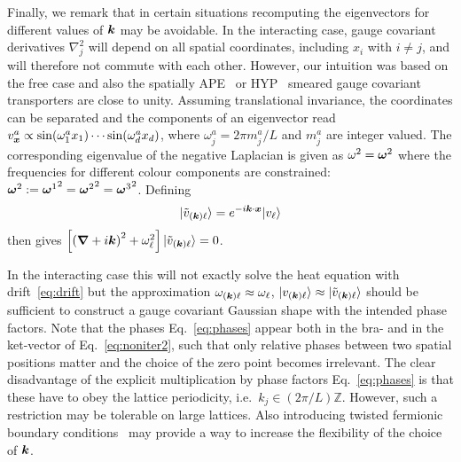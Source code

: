 Finally, we remark that in certain situations recomputing the eigenvectors
for different values of $\boldsymbol{k}$
may be avoidable. In the interacting case, gauge covariant derivatives
$\nabla^2_j$ will depend on all spatial coordinates, including
$x_i$ with $i\neq j$, and will therefore not commute with each other.
However, our intuition was based on the free case and
also the spatially APE~\cite{Falcioni:1984ei}
or HYP~\cite{Hasenfratz:2001hp} smeared gauge covariant
transporters are close to unity.
Assuming translational invariance, the coordinates can be separated and
the components of an eigenvector read
$v^a_{\boldsymbol{x}}\propto\sin(\omega_1^ax_1)\cdots\sin(\omega_d^ax_d)$,
where $\omega_j^a=2\pi m_j^a/L$ and $m_j^a$ are integer valued.
The corresponding eigenvalue of the negative Laplacian
is given as $\omega^2=\boldsymbol{\omega}^2$ where
the frequencies for different colour components
are constrained: $\boldsymbol{\omega}^2:={\boldsymbol{\omega}^1}^2={\boldsymbol{\omega}^2}^2={\boldsymbol{\omega}^3}^2$. Defining
\begin{equation}
|\tilde{v}_{(\boldsymbol{k})\ell}\rangle=e^{-i\boldsymbol{k}\cdot\boldsymbol{x}}|v_{\ell}\rangle
\label{eq:phases}
\end{equation}
then gives
$\left[\left(\boldsymbol{\nabla}+i\boldsymbol{k}\right)^2+\omega_{\ell}^2\right]|\tilde{v}_{(\boldsymbol{k})\ell}\rangle=0$.

In the interacting case this will not exactly solve the heat equation
with drift~\eqref{eq:drift} but
the approximation $\omega_{(\boldsymbol{k})\ell}\approx\omega_{\ell}$,
$|v_{(\boldsymbol{k})\ell}\rangle\approx|\tilde{v}_{(\boldsymbol{k})\ell}\rangle$ should
be sufficient to construct a gauge covariant Gaussian shape
with the intended phase factors.
Note that the phases Eq.~\eqref{eq:phases} appear both
in the bra- and in the ket-vector of Eq.~\eqref{eq:noniter2},
such that only relative
phases between two spatial positions matter and the choice of the zero
point becomes irrelevant. The clear disadvantage of the explicit
multiplication by phase factors Eq.~\eqref{eq:phases} is that these
have to obey the lattice periodicity, i.e.\ $k_j\in (2\pi/L)\mathbb{Z}$.
However, such a restriction may be tolerable on large lattices.
Also introducing twisted fermionic boundary
conditions~\cite{Bedaque:2004kc,Sachrajda:2004mi} may
provide a way to increase the flexibility of the choice of $\boldsymbol{k}$.

